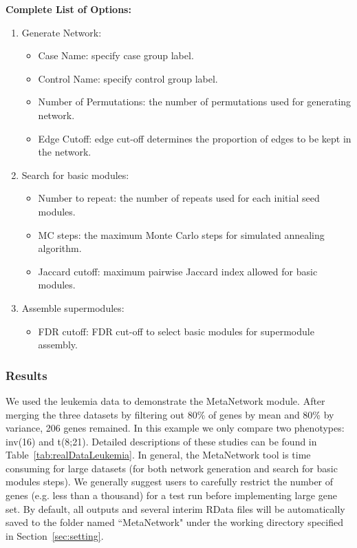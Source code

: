 \textbf{Complete List of Options:} 
\begin{enumerate}
\item Generate Network:
\begin{itemize}
\item Case Name: specify case group label.
\item Control Name: specify control group label.
\item Number of Permutations: the number of permutations used for generating network.
\item Edge Cutoff: edge cut-off  determines the proportion of edges to be kept in the network.
\end{itemize}

\item Search for basic modules:
\begin{itemize}
\item Number to repeat:  the number of repeats used for each initial seed modules.
\item MC steps:  the maximum Monte Carlo steps for simulated annealing algorithm.
\item Jaccard cutoff: maximum pairwise Jaccard index allowed for basic modules.
\end{itemize}
\item Assemble supermodules:

\begin{itemize}
\item FDR cutoff:  FDR cut-off to select basic modules for supermodule assembly.
\end{itemize}

\end{enumerate}

\subsubsection{Results}

We used the leukemia data to demonstrate the MetaNetwork module.
After merging the three datasets by filtering out 80\% of genes by mean and 80\% by variance, 206 genes remained.
In this example we only compare two phenotypes: inv(16) and t(8;21).
Detailed descriptions of these studies can be found in Table~\ref{tab:realDataLeukemia}. 
In general, the MetaNetwork tool is time consuming for large datasets (for both network generation and search for basic modules steps).
We generally suggest users to carefully restrict the number of genes (e.g. less than a thousand) for a test run before implementing large gene set.
By default, all outputs and several interim RData files will be automatically saved to the folder named ``MetaNetwork" under the working directory specified in Section~\ref{sec:setting}.


